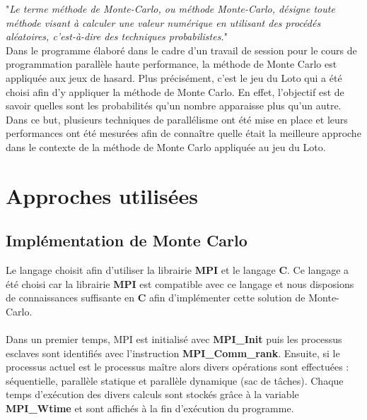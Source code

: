 \documentclass[a4paper,12pt]{article}
\begin{document}
"\textit{Le terme méthode de Monte-Carlo, ou méthode Monte-Carlo, désigne toute méthode visant à calculer une valeur numérique en utilisant des procédés aléatoires, c'est-à-dire des techniques probabilistes.}" \cite{wiki:montecarlo}
\\
Dans le programme élaboré dans le cadre d'un travail de session pour le cours de programmation parallèle haute performance, la méthode de Monte Carlo est appliquée aux jeux de hasard.
Plus précisément, c'est le jeu du Loto qui a été choisi afin d'y appliquer la méthode de Monte Carlo. En effet, l'objectif est de savoir quelles sont les probabilités qu'un nombre apparaisse plus qu'un autre. Dans ce but, plusieurs techniques de parallélisme ont été mise en place et leurs performances ont été mesurées afin de connaître quelle était la meilleure approche dans le contexte de la méthode de Monte Carlo appliquée au jeu du Loto. 


\section{Approches utilisées}

\subsection{Implémentation de Monte Carlo}
Le langage choisit afin d'utiliser la librairie \textbf{MPI} et le langage \textbf{C}. Ce langage a été choisi car la librairie \textbf{MPI} est compatible avec ce langage et nous disposions de connaissances suffisante en \textbf{C} afin d'implémenter cette solution de Monte-Carlo. 
\\\\Dans un premier temps, MPI est initialisé avec \textbf{MPI\_Init} puis les processus esclaves sont identifiés avec l'instruction \textbf{MPI\_Comm\_rank}. Ensuite, si le processus actuel est le processus maître alors divers opérations sont effectuées : séquentielle, parallèle statique et parallèle dynamique (sac de tâches). Chaque temps d'exécution des divers calculs sont stockés grâce à la variable \textbf{MPI\_Wtime} et sont affichés à la fin d'exécution du programme.
\end{document}
